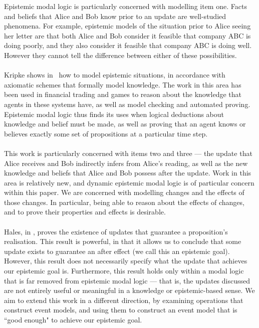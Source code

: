 Epistemic modal logic is particularly concerned with modelling item one.
Facts and beliefs that Alice and Bob know prior to an update are well-studied phenomena.
For example, epistemic models of the situation prior to Alice seeing her letter are that both Alice
and Bob consider it feasible that company ABC is doing poorly, and they also consider it feasible
that company ABC is doing well.
However they cannot tell the difference between either of these possibilities.\\
\\
Kripke shows in \FIXME\ how to model epistemic situations, in accordance with axiomatic schemes that
formally model knowledge.
The work in this area has been used in financial trading and games to reason about the knowledge
that agents in these systems have, as well as model checking and automated proving.
Epistemic modal logic thus finds its uses when logical deductions about knowledge and belief must be
made, as well as proving that an agent knows or believes exactly some set of propositions at a
particular time step.\\
\\
This work is particularly concerned with items two and  three --- the update that Alice receives and Bob
indirectly infers from Alice's reading, as well as the new knowledge and beliefs that Alice and Bob
possess after the update.
Work in this area is relatively new, and dynamic epistemic modal logic is of particular concern
within this paper.
We are concerned with modelling changes and the effects of those changes.
In particular, being able to reason about the effects of changes, and to prove their properties and
effects is desirable.\\
\\
Hales, in \cite{hales13synthesis}, proves the existence of updates that guarantee a
proposition's realisation.
This result is powerful, in that it allows us to conclude that some update exists to guarantee
an after effect (we call this an epistemic goal).
However, this result does not necessarily specify what the update that achieves our epistemic goal is.
Furthermore, this result holds only within a modal logic that is far removed from epistemic modal
logic --- that is, the updates discussed are not entirely useful or meaningful in a knowledge or
epistemic-based sense.
We aim to extend this work in a different direction, by examining operations that construct event
models, and using them to construct an event model that is ``good enough" to achieve our epistemic
goal.\\
